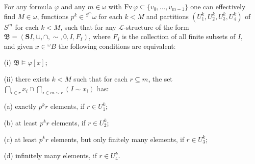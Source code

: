 For any formula $\varphi$ and any $m \in \omega$ with $\mathrm{Fv}\,\varphi \subseteq \{v_0, \ldots, v_{m-1}\}$ one can effectively find $M \in \omega$, functions $p^k \in {}^{S^m}\omega$ for each $k < M$ and partitions $(U_1^k, U_2^k, U_3^k, U_4^k)$ of $S^m$ for each $k < M$, such that for any $\mathcal{L}$-structure of the form $\mathfrak{B} = (\mathbf{S}I, \cup, \cap, \sim, 0, I, F_I)$, where $F_I$ is the collection of all finite subsets of $I$, and given $x \in {}^{\omega}B$ the following conditions are equivalent:

(i) $\mathfrak{B} \models \varphi[x]$;

(ii) there exists $k < M$ such that for each $r \subseteq m$, the set $\bigcap_{i \in r} x_i \cap \bigcap_{i \in m \sim r}(I \sim x_i)$ has:

(a) exactly $p^k r$ elements, if $r \in U_1^k$;

(b) at least $p^k r$ elements, if $r \in U_2^k$;

(c) at least $p^k r$ elements, but only finitely many elements, if $r \in U_3^k$;

(d) infinitely many elements, if $r \in U_4^k$.
